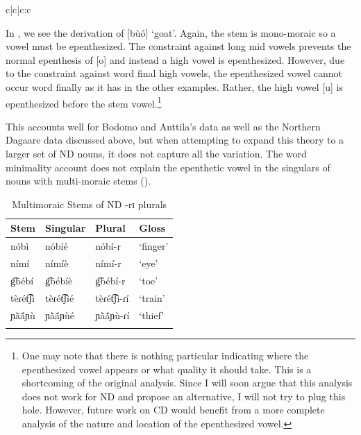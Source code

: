 \documentclass[output=paper,colorlinks,citecolor=brown,
]{langscibook}
\begin{document}
\begin{table}

  \caption{Tableau deriving [buo] `goat' in Northern Dagaare}
  \label{tab:Caragine:goat}

\begin{tableau}{c|c|c:c} 
\const{*I]} 
 \vio{*!} \vio{} \vio{} \vio{} 
 \vio{} \vio{*} \vio{} \vio{*!} 
 \vio{} \vio{*} \vio{} \vio{} 
 \vio{} \vio{*} \vio{*!} \vio{} 
\end{tableau}
\end{table}

In , we see the derivation of [bùó] ‘goat’. Again, the stem is mono-moraic so a vowel must be epenthesized. The constraint against long mid vowels prevents the normal epenthesis of [o] and instead a high vowel is epenthesized. However, due to the constraint against word final high vowels, the epenthesized vowel cannot occur word finally as it has in the other examples. Rather, the  high vowel [u] is epenthesized before the stem vowel.\footnote{One may note that there is nothing particular indicating where the epenthesized vowel appears or what quality it should take. This is a shortcoming of the original analysis. Since I will soon argue that this analysis does not work for ND and propose an alternative, I will not try to plug this hole. However, future work on CD would benefit from a more complete analysis of the nature and location of the epenthesized vowel.}

This accounts well for Bodomo and Anttila’s data as well as the Northern Dagaare data discussed above, but when attempting to expand this theory to a larger set of ND nouns, it does not capture all the variation. The word minimality account does not explain the epenthetic vowel in the singulars of nouns with multi-moraic stems ().

\begin{table}

  \caption{Multimoraic Stems of ND -rɪ plurals}
  \label{tab:Caragine:epenth}
  
\begin{tabular}{llll}
\lsptoprule 
Stem & Singular & Plural & Gloss\\
\midrule\midrule
nóbì & nóbíé  & nóbí-r &  `finger' \\
nímí &  nímíè &  nímí-r &  `eye'\\
g͡bébí& g͡bébíè & g͡bébí-r & `toe'\\
tèɾét͡ʃì  & tèɾét͡ʃìé  & tèɾét͡ʃì-ɾí &  `train'\\
ɲã̀ã́ɲù  &  ɲã̀ã́ɲùé &  ɲã̀ã́ɲù-ɾí &  `thief'\\
\lspbottomrule 

\end{tabular}
\end{table}
\end{document}
